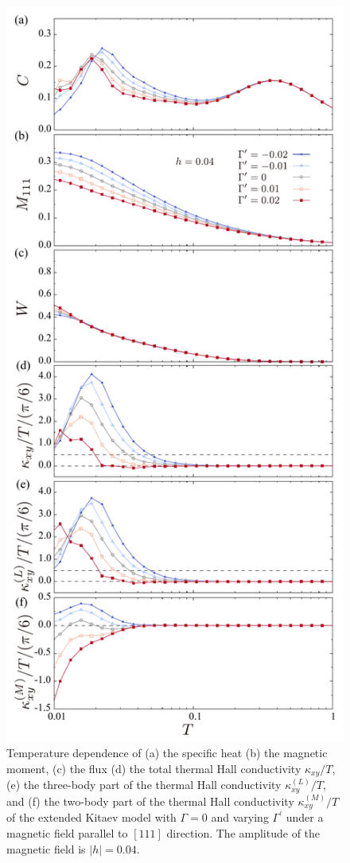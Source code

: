 \documentclass[twocolumn,superscriptaddress,showpacs, longbibliography, aps, prb]{revtex4-2}
\newcommand{\red}[1]{\textcolor{red}{#1}}
\newcommand{\blue}[1]{\textcolor{blue}{#1}}
\begin{document}
\begin{figure}
  \begin{center}
    \includegraphics[width=0.9\linewidth]{Figs/plot_all_h0.04_Gp.pdf}
  \end{center}
  \caption{Temperature dependence of (a) the specific heat (b) the magnetic moment, (c) the flux 
   (d) the total thermal Hall conductivity $\kappa_{xy}/T$, 
   (e) the  three-body part of  the thermal Hall conductivity $\kappa_{xy}^{(L)}/T$, and 
   (f) the  two-body part of  the thermal Hall conductivity $\kappa_{xy}^{(M)}/T$ of the
  extended Kitaev model with $\Gamma=0$ and varying $\Gamma^{\prime}$
  under a magnetic field parallel to $[111]$ direction. The amplitude of the magnetic field is $|h|=0.04$.
  }
  \label{fig:all_h0.04_Gp}
\end{figure}
\end{document}
